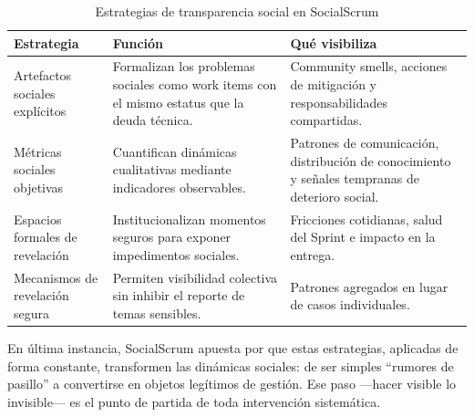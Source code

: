 \begin{table}[!htbp]
    \caption{Estrategias de transparencia social en SocialScrum}
    \label{tab:transparencia_mecanismos}
    \centering
    \small
    \begin{tabular}{@{}p{3.5cm}p{5.5cm}p{4.5cm}@{}}
        \toprule
        \textbf{Estrategia}                                                                          & \textbf{Función} & \textbf{Qué visibiliza} \\
        \midrule
        Artefactos sociales explícitos                                                               &
        Formalizan los problemas sociales como work items con el mismo estatus que la deuda técnica. &
        Community smells, acciones de mitigación y responsabilidades compartidas.                                                                 \\
        \addlinespace
        Métricas sociales objetivas                                                                  &
        Cuantifican dinámicas cualitativas mediante indicadores observables.                         &
        Patrones de comunicación, distribución de conocimiento y señales tempranas de deterioro social.                                           \\
        \addlinespace

        Espacios formales de revelación                                                              &
        Institucionalizan momentos seguros para exponer impedimentos sociales.                       &
        Fricciones cotidianas, salud del Sprint e impacto en la entrega.                                                                          \\
        \addlinespace

        Mecanismos de revelación segura                                                              &
        Permiten visibilidad colectiva sin inhibir el reporte de temas sensibles.                    &
        Patrones agregados en lugar de casos individuales.                                                                                        \\
        \bottomrule
    \end{tabular}
\end{table}

En última instancia, SocialScrum apuesta por que estas estrategias, aplicadas de forma constante, transformen las dinámicas sociales: de ser simples ``rumores de pasillo'' a convertirse en objetos legítimos de gestión.
Ese paso —hacer visible lo invisible— es el punto de partida de toda intervención sistemática.

